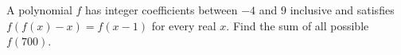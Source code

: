 A polynomial $f$ has integer coefficients between $-4$ and $9$ inclusive and satisfies $f(f(x)-x)=f(x-1)$ for every real $x$. Find the sum of all possible $f(700)$.
